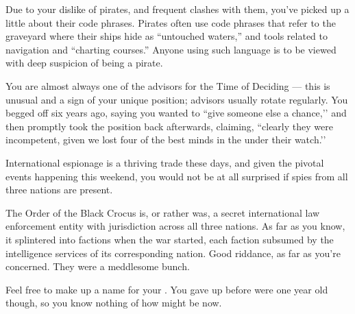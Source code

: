 \documentclass[char]{GL2020}
\begin{document}
\begin{itemz}[Notes]
    \item Due to your dislike of pirates, and frequent clashes with them, you've picked up a little about their code phrases. Pirates often use code phrases that refer to the graveyard where their ships hide as ``untouched waters,'' and tools related to navigation and ``charting courses.'' Anyone using such language is to be viewed with deep suspicion of being a pirate.
    \item You are almost always one of the advisors for the Time of Deciding — this is unusual and a sign of your unique position; advisors usually rotate regularly. You begged off six years ago, saying you wanted to ``give someone else a chance,’’ and then promptly took the position back afterwards, claiming, ``clearly they were incompetent, given we lost four of the best minds in the \pFarm{} under their watch.’’
    \item International espionage is a thriving trade these days, and given the pivotal events happening this weekend, you would not be at all surprised if spies from all three nations are present.
    \item The Order of the Black Crocus is, or rather was, a secret international law enforcement entity with jurisdiction across all three nations. As far as you know, it splintered into factions when the war started, each faction subsumed by the intelligence services of its corresponding nation. Good riddance, as far as you're concerned. They were a meddlesome bunch.
     \item Feel free to make up a name for your \cPirateChild{\offspring}. You gave \cPirateChild{\them} up before \cPirateChild{\they} were one year old though, so you know nothing of how \cPirateChild{\they} might be now.
\end{itemz}
\end{document}
